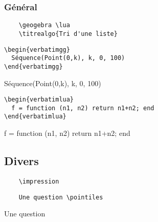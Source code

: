 \documentclass{article}
\begin{document}
  \subsubsection{Général}

  \begin{Verbatim}
    \geogebra \lua
    \titrealgo{Tri d'une liste}
  \end{Verbatim}
  \begin{minipage}{1.0\linewidth}
    \geogebra \lua
  \end{minipage}

  \begin{Verbatim}
\begin{verbatimgg}
  Séquence(Point(0,k), k, 0, 100)
\end{verbatimgg}
  \end{Verbatim}
  \begin{minipage}{1.0\linewidth}
    \begin{verbatimgg}
Séquence(Point(0,k), k, 0, 100) 
    \end{verbatimgg}
  \end{minipage}

  \begin{Verbatim}
\begin{verbatimlua}
  f = function (n1, n2) return n1+n2; end
\end{verbatimlua}  
  \end{Verbatim}
  \begin{minipage}{1.0\linewidth}
    \begin{verbatimlua}
      f = function (n1, n2) return n1+n2; end
    \end{verbatimlua}
  \end{minipage}
  \subsection{Divers}
  
  \begin{Verbatim}
    \impression
  \end{Verbatim}
  \begin{minipage}{\linewidth}
    \impression
  \end{minipage}

  \begin{Verbatim}
    Une question \pointiles
  \end{Verbatim}
  \begin{minipage}{\linewidth}
    Une question \pointiles
  \end{minipage}
  
\end{document}
